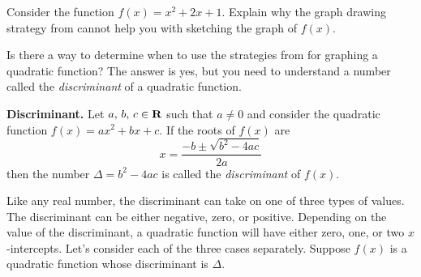 \documentclass[a4paper,oneside,12pt]{article}
\begin{document}
\begin{exercise}
Consider the function $f(x) = x^2 + 2x + 1$.  Explain why the graph
drawing strategy from  cannot help you
with sketching the graph of $f(x)$.
\end{exercise}

Is there a way to determine when to use the strategies
from  for graphing a
quadratic function?  The answer is yes, but you need to understand a
number called the \emph{discriminant} of a quadratic function.

\begin{definition}
\label{def:discriminant}
\textbf{Discriminant.}
Let ${a},\, {b},\, {c} \in \mathbf{R}$ such that $a \neq 0$ and consider the
quadratic function $f(x) = ax^2 + bx + c$.  If the roots of $f(x)$ are
\[
x
=
\frac{
  -b \pm \sqrt{b^2 - 4ac}
}{
  2a
}
\]
then the number $\Delta = b^2 - 4ac$ is called the \emph{discriminant}
of $f(x)$.
\end{definition}

Like any real number, the discriminant can take on one of three types
of values.  The discriminant can be either negative, zero, or
positive.  Depending on the value of the discriminant, a quadratic
function will have either zero, one, or two $x$-intercepts.  Let's
consider each of the three cases separately.  Suppose $f(x)$ is a
quadratic function whose discriminant is $\Delta$.
\end{document}
